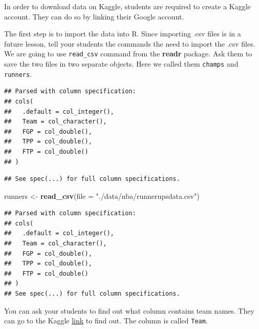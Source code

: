 \documentclass[]{book}
\newenvironment{Shaded}{\begin{snugshade}}{\end{snugshade}}
\newcommand{\CommentTok}[1]{\textcolor[rgb]{0.56,0.35,0.01}{\textit{#1}}}
\newcommand{\DataTypeTok}[1]{\textcolor[rgb]{0.13,0.29,0.53}{#1}}
\newcommand{\KeywordTok}[1]{\textcolor[rgb]{0.13,0.29,0.53}{\textbf{#1}}}
\newcommand{\NormalTok}[1]{#1}
\newcommand{\OperatorTok}[1]{\textcolor[rgb]{0.81,0.36,0.00}{\textbf{#1}}}
\newcommand{\OtherTok}[1]{\textcolor[rgb]{0.56,0.35,0.01}{#1}}
\newcommand{\StringTok}[1]{\textcolor[rgb]{0.31,0.60,0.02}{#1}}
\begin{document}
In order to download data on Kaggle, students are required to create a Kaggle account. They can do so by linking their Google account.

The first step is to import the data into R. Since importing .csv files is in a future lesson, tell your students the commands the need to import the .csv files. We are going to use \texttt{read\_csv} command from the \textbf{readr} package. Ask them to save the two files in two separate objects. Here we called them \texttt{champs} and \texttt{runners}.

\begin{Shaded}
\end{Shaded}

\begin{verbatim}
## Parsed with column specification:
## cols(
##   .default = col_integer(),
##   Team = col_character(),
##   FGP = col_double(),
##   TPP = col_double(),
##   FTP = col_double()
## )
\end{verbatim}

\begin{verbatim}
## See spec(...) for full column specifications.
\end{verbatim}

\begin{Shaded}
\begin{Highlighting}[]
\NormalTok{runners <-}\StringTok{ }\KeywordTok{read_csv}\NormalTok{(}\DataTypeTok{file =} \StringTok{"./data/nba/runnerupsdata.csv"}\NormalTok{)}
\end{Highlighting}
\end{Shaded}

\begin{verbatim}
## Parsed with column specification:
## cols(
##   .default = col_integer(),
##   Team = col_character(),
##   FGP = col_double(),
##   TPP = col_double(),
##   FTP = col_double()
## )
## See spec(...) for full column specifications.
\end{verbatim}

You can ask your students to find out what column contains team names. They can go to the Kaggle \href{https://www.kaggle.com/daverosenman/nba-finals-team-stats}{link} to find out. The column is called \texttt{Team}.
\end{document}
